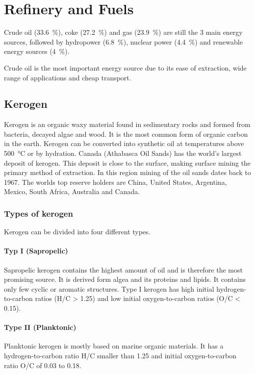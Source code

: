 \section{Refinery and Fuels}
Crude oil (\SI{33.6}{\percent}), coke (\SI{27.2}{\percent}) and gas (\SI{23.9}{\percent}) are still the 3 main energy sources, followed by hydropower (\SI{6.8}{\percent}), nuclear power (\SI{4.4}{\percent}) and renewable energy sources (\SI{4}{\percent}).

Crude oil is the most important energy source due to its ease of extraction, wide range of applications and cheap transport.

\subsection{Kerogen}
Kerogen is an organic waxy material found in sedimentary rocks and formed from bacteria, decayed algae and wood.
It is the most common form of organic carbon in the earth.
Kerogen can be converted into synthetic oil at temperatures above \SI{500}{\celsius} or by hydration.
Canada (Athabasca Oil Sands) has the world's largest deposit of kerogen.
This deposit is close to the surface, making surface mining the primary method of extraction.
In this region mining of the oil sands dates back to 1967.
The worlds top reserve holders are China, United States, Argentina, Mexico, South Africa, Australia and Canada.

\subsubsection{Types of kerogen}
Kerogen can be divided into four different types.

\paragraph{Typ I (Sapropelic)}
Sapropelic kerogen contains the highest amount of oil and is therefore the most promising source.
It is derived form algea and its proteins and lipids.
It contains only few cyclic or aromatic structures.
Type I kerogen has high initial hydrogen-to-carbon ratios (H/C > 1.25) and low initial oxygen-to-carbon ratios (O/C < 0.15).

\paragraph{Type II (Planktonic)}
Planktonic kerogen is mostly based on marine organic materials.
It has a hydrogen-to-carbon ratio H/C smaller than 1.25 and initial oxygen-to-carbon ratio O/C of 0.03 to 0.18.

